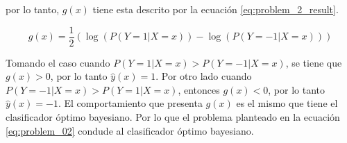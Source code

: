 por lo tanto, $g(x)$ tiene esta descrito por la ecuación \ref{eq:problem_2_result}.

\begin{equation}
    g(x) = \frac{1}{2} \left (\log (P(Y=1|X=x))-\log (P(Y=-1|X=x)) \right ) \label{eq:problem_2_result}
\end{equation}

Tomando el caso cuando $P(Y=1|X=x) > P(Y=-1|X=x)$, se tiene que $g(x)>0$, por lo tanto $\hat{y}(x)=1$. Por otro lado cuando $P(Y=-1|X=x) > P(Y=1|X=x)$, entonces $g(x)<0$, por lo tanto $\hat{y}(x)=-1$. El comportamiento que presenta $g(x)$ es el mismo que tiene el clasificador óptimo bayesiano. Por lo que el problema planteado en la ecuación \ref{eq:problem_02} condude al clasificador óptimo bayesiano.